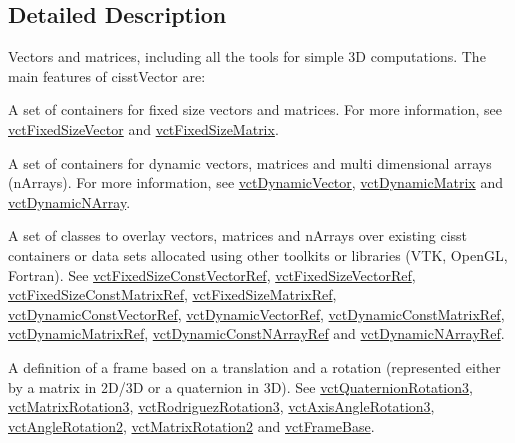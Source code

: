 \subsection{Detailed Description}
Vectors and matrices, including all the tools for simple 3\-D computations. The main features of cisst\-Vector are\-:


\begin{DoxyItemize}
\item A set of containers for fixed size vectors and matrices. For more information, see \hyperlink{classvct_fixed_size_vector}{vct\-Fixed\-Size\-Vector} and \hyperlink{classvct_fixed_size_matrix}{vct\-Fixed\-Size\-Matrix}.
\item A set of containers for dynamic vectors, matrices and multi dimensional arrays (n\-Arrays). For more information, see \hyperlink{classvct_dynamic_vector}{vct\-Dynamic\-Vector}, \hyperlink{classvct_dynamic_matrix}{vct\-Dynamic\-Matrix} and \hyperlink{classvct_dynamic_n_array}{vct\-Dynamic\-N\-Array}.
\item A set of classes to overlay vectors, matrices and n\-Arrays over existing cisst containers or data sets allocated using other toolkits or libraries (V\-T\-K, Open\-G\-L, Fortran). See \hyperlink{classvct_fixed_size_const_vector_ref}{vct\-Fixed\-Size\-Const\-Vector\-Ref}, \hyperlink{classvct_fixed_size_vector_ref}{vct\-Fixed\-Size\-Vector\-Ref}, \hyperlink{classvct_fixed_size_const_matrix_ref}{vct\-Fixed\-Size\-Const\-Matrix\-Ref}, \hyperlink{classvct_fixed_size_matrix_ref}{vct\-Fixed\-Size\-Matrix\-Ref}, \hyperlink{classvct_dynamic_const_vector_ref}{vct\-Dynamic\-Const\-Vector\-Ref}, \hyperlink{classvct_dynamic_vector_ref}{vct\-Dynamic\-Vector\-Ref}, \hyperlink{classvct_dynamic_const_matrix_ref}{vct\-Dynamic\-Const\-Matrix\-Ref}, \hyperlink{classvct_dynamic_matrix_ref}{vct\-Dynamic\-Matrix\-Ref}, \hyperlink{classvct_dynamic_const_n_array_ref}{vct\-Dynamic\-Const\-N\-Array\-Ref} and \hyperlink{classvct_dynamic_n_array_ref}{vct\-Dynamic\-N\-Array\-Ref}.
\item A definition of a frame based on a translation and a rotation (represented either by a matrix in 2\-D/3\-D or a quaternion in 3\-D). See \hyperlink{classvct_quaternion_rotation3}{vct\-Quaternion\-Rotation3}, \hyperlink{classvct_matrix_rotation3}{vct\-Matrix\-Rotation3}, \hyperlink{classvct_rodriguez_rotation3}{vct\-Rodriguez\-Rotation3}, \hyperlink{classvct_axis_angle_rotation3}{vct\-Axis\-Angle\-Rotation3}, \hyperlink{classvct_angle_rotation2}{vct\-Angle\-Rotation2}, \hyperlink{classvct_matrix_rotation2}{vct\-Matrix\-Rotation2} and \hyperlink{classvct_frame_base}{vct\-Frame\-Base}.

\end{DoxyItemize}
